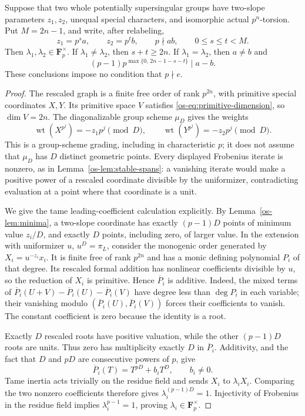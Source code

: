 \begin{lemma}\label{os-lem:two-chains}
Suppose that two whole potentially supersingular groups have two-slope
parameters $z_1,z_2$, unequal special characters, and isomorphic actual
$p^n$-torsion.  Put $M=2n-1$, and write, after relabeling,
\[
 z_1=p^s a,\qquad z_2=p^t b,
 \qquad p\nmid ab,\qquad 0\le s\le t<M.
\]
Then $\lambda_1,\lambda_2\in\mathbf F_p^{\times}$.  If
$\lambda_1\ne\lambda_2$, then $s+t\ge2n$.  If
$\lambda_1=\lambda_2$, then $a\ne b$ and
\begin{equation}\label{os-eq:two-chain-divisibility}
 (p-1)p^{\max\{0,\,2n-1-s-t\}}\mid a-b.
\end{equation}
These conclusions impose no condition that $p\nmid e$.
\end{lemma}

\begin{proof}
The rescaled graph is a finite free order of rank $p^{2n}$, with
primitive special coordinates $X,Y$.  Its primitive space $V$ satisfies
\eqref{os-eq:primitive-dimension}, so $\dim V=2n$.  The diagonalizable
group scheme $\mu_D$ gives the weights
\[
 \operatorname{wt}(X^{p^j})=-z_1p^j\pmod D,
 \qquad
 \operatorname{wt}(Y^{p^j})=-z_2p^j\pmod D.
\]
This is a group-scheme grading, including in characteristic $p$; it
does not assume that $\mu_D$ has $D$ distinct geometric points.
Every displayed Frobenius iterate is nonzero, as in
Lemma~\ref{os-lem:stable-spans}: a vanishing iterate would make a
positive power of a rescaled coordinate divisible by the uniformizer,
contradicting evaluation at a point where that coordinate is a unit.

We give the tame leading-coefficient calculation explicitly.  By
Lemma~\ref{os-lem:minima}, a two-slope coordinate has exactly
$(p-1)D$ points of minimum value $z_i/D$, and exactly $D$ points,
including zero, of larger value.  In the extension with uniformizer
$u$, $u^D=\pi_L$, consider the monogenic order generated by
$X_i=u^{-z_i}x_i$.  It is finite free of rank $p^{2n}$ and has a
monic defining polynomial $P_i$ of that degree.  Its rescaled formal
addition has nonlinear coefficients divisible by $u$, so the
reduction of $X_i$ is primitive.  Hence $\overline P_i$ is additive.
Indeed, the mixed terms of
$\overline P_i(U+V)-\overline P_i(U)-\overline P_i(V)$ have degree
less than $\deg P_i$ in each variable; their vanishing modulo
$(\overline P_i(U),\overline P_i(V))$ forces their coefficients to
vanish.  The constant coefficient is zero because the identity is a
root.

Exactly $D$ rescaled roots have positive valuation, while the other
$(p-1)D$ roots are units.  Thus zero has multiplicity exactly $D$ in
$\overline P_i$.  Additivity, and the fact that $D$ and $pD$ are
consecutive powers of $p$, give
\[
 \overline P_i(T)=T^{pD}+b_iT^D,\qquad b_i\ne0.
\]
Tame inertia acts trivially on the residue field and sends $X_i$ to
$\lambda_iX_i$.  Comparing the two nonzero coefficients therefore
gives $\lambda_i^{(p-1)D}=1$.  Injectivity of Frobenius in the residue
field implies $\lambda_i^{p-1}=1$, proving
$\lambda_i\in\mathbf F_p^{\times}$.


\end{proof}
